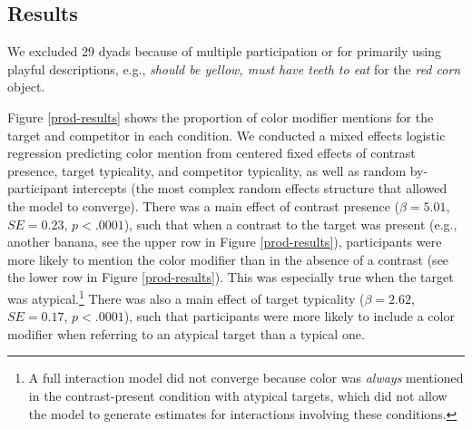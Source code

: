 \documentclass[10pt,letterpaper]{article}
\newcommand{\figref}[1]{Figure \ref{#1}}
\begin{document}
%
%


\subsection{Results}
We excluded 29 dyads because of multiple participation or for primarily using playful descriptions, e.g., \textit{should be yellow, must have teeth to eat} for the \textit{red corn} object.

\figref{prod-results} shows the proportion of color modifier mentions for the target and competitor in each condition. We conducted a mixed effects logistic regression predicting color mention from centered fixed effects of contrast presence, target typicality, and competitor typicality, as well as random by-participant intercepts (the most complex random effects structure that allowed the model to converge). %
There was a main effect of contrast presence ($\beta = 5.01$, $SE = 0.23$, $p < .0001$), such that when a contrast to the target was present (e.g., another banana, see the upper row in \figref{prod-results}),  participants were more likely to mention the color modifier than in the absence of a contrast (see the lower row in \figref{prod-results}). This was especially true when the target was atypical.\footnote{A full interaction model did not converge because color was \emph{always} mentioned in the contrast-present condition with atypical targets, which did not allow the model to generate estimates for interactions involving these conditions.} There was also a main effect of target typicality ($\beta = 2.62$, $SE = 0.17$, $p < .0001$), such that participants were more likely to include a color modifier when referring to an atypical target than a typical one. 
\end{document}
